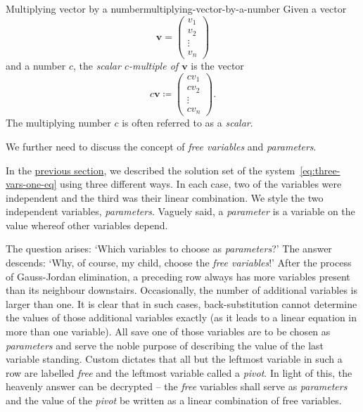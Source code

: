 \begin{definition}{Multiplying vector by a number}{multiplying-vector-by-a-number}
 Given a vector
 \[
  \mathbf{v} = 
  \begin{pmatrix}
   v_1\\
   v_2\\
   \vdots\\
   v_n
  \end{pmatrix}
 \]
 and a number $c$, the \emph{scalar $c$-multiple of $\mathbf{v}$} is the vector
 \[
  c \mathbf{v} \coloneqq 
  \begin{pmatrix}
   cv_1\\
   cv_2\\
   \vdots\\
   cv_n
  \end{pmatrix}.
 \]
 The multiplying number $c$ is often referred to as a \emph{scalar}.
\end{definition}

We further need to discuss the concept of \emph{free variables} and
\emph{parameters}.

In the \hyperref[sec:visualizing-linear-systems]{previous section}, we described
the solution set of the system~\eqref{eq:three-vars-one-eq} using three
different ways. In each case, two of the variables were independent and the
third was their linear combination. We style the two independent variables,
\emph{parameters}. Vaguely said, a \emph{parameter} is a variable on the value
whereof other variables depend.

The question arises: `Which variables to choose as \emph{parameters}?' The
answer descends: `Why, of course, my child, choose the \emph{free variables}!'
After the process of Gauss-Jordan elimination, a preceding row always has more
variables present than its neighbour downstairs. Occasionally, the number of
additional variables is larger than one. It is clear that in such cases,
back-substitution cannot determine the values of those additional variables
exactly (as it leads to a linear equation in more than one variable). All save
one of those variables are to be chosen as \emph{parameters} and serve the noble
purpose of describing the value of the last variable standing. Custom dictates
that all but the leftmost variable in such a row are labelled \emph{free} and
the leftmost variable called a \emph{pivot}. In light of this, the heavenly
answer can be decrypted -- the \emph{free} variables shall serve as
\emph{parameters} and the value of the \emph{pivot} be written as a linear
combination of free variables.

